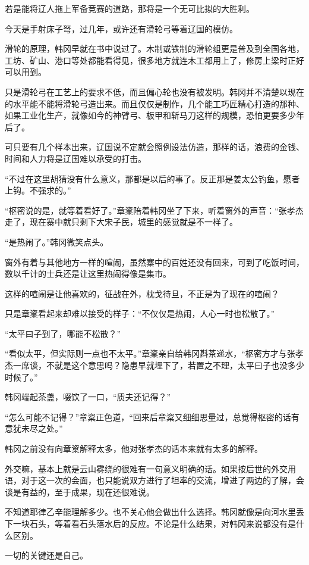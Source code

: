 若是能将辽人拖上军备竞赛的道路，那将是一个无可比拟的大胜利。

今天是手射床子弩，过几年，或许还有滑轮弓等着辽国的模仿。

滑轮的原理，韩冈早就在书中说过了。木制或铁制的滑轮组更是普及到全国各地，工坊、矿山、港口等处都能看得见，很多地方就连木工都用上了，修房上梁时正好可以用到。

只是滑轮弓在工艺上的要求不低，而且偏心轮也没有被发明。韩冈并不清楚以现在的水平能不能将滑轮弓造出来。而且仅仅是制作，几个能工巧匠精心打造的那种、如果工业化生产，就像如今的神臂弓、板甲和斩马刀这样的规模，恐怕更要多少年后了。

可只要有几个样本出来，辽国说不定就会照例设法仿造，那样的话，浪费的金钱、时间和人力将是辽国难以承受的打击。

“不过在这里胡猜没有什么意义，那都是以后的事了。反正那是姜太公钓鱼，愿者上钩。不强求的。”

“枢密说的是，就等着看好了。”章楶陪着韩冈坐了下来，听着窗外的声音：“张孝杰走了，现在寨中就只剩下大宋子民，城里的感觉就是不一样了。

“是热闹了。”韩冈微笑点头。

窗外有着与其他地方一样的喧闹，虽然寨中的百姓还没有回来，可到了吃饭时间，数以千计的士兵还是让这里热闹得像是集市。

这样的喧闹是让他喜欢的，征战在外，枕戈待旦，不正是为了现在的喧闹？

只是章楶看起来却难以接受的样子：“不仅仅是热闹，人心一时也松散了。”

“太平曰子到了，哪能不松散？”

“看似太平，但实际则一点也不太平。”章楶亲自给韩冈斟茶递水，“枢密方才与张孝杰一席谈，不就是这个意思吗？隐患早就埋下了，若置之不理，太平曰子也没多少时候了。”

韩冈端起茶盏，啜饮了一口，“质夫还记得？”

“怎么可能不记得？”章楶正色道，“回来后章楶又细细思量过，总觉得枢密的话有意犹未尽之处。”

韩冈之前没有向章楶解释太多，他对张孝杰的话本来就有太多的解释。

外交嘛，基本上就是云山雾绕的很难有一句意义明确的话。如果按后世的外交用语，对于这一次的会面，也只能说双方进行了坦率的交流，增进了两边的了解，会谈是有益的，至于成果，现在还很难说。

不知道耶律乙辛能理解多少。也不关心他会做出什么选择。韩冈就像是向河水里丢下一块石头，等着看石头落水后的反应。不论是什么结果，对韩冈来说都没有是什么区别。

一切的关键还是自己。

